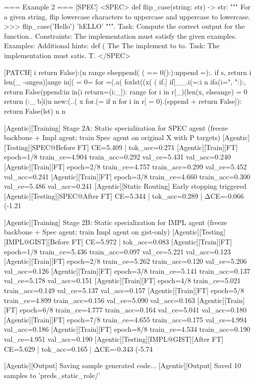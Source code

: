 === Example 2 ===
[SPEC]
<SPEC> def flip_case(string: str) -> str: """ For a given string, flip lowercase characters to uppercase and uppercase to lowercase. >>> flip_case('Hello') 'hELLO' """. Task: Compute the correct output for the function.. Constraints: The implementation must satisfy the given examples. Examples: Additional hints: def ( The The implement to to. Task: The implementation must satis. T. </SPEC>

[PATCH]
i return False):(n range elseppend( ( == 0():):nppend =):. if s, return i len(_ -angea)]ange in[( = 0= for =(.a( forlst((x( ( if.] if]__.i(=:i n ifa(i=", ":):, return False(ppend:in in(i return=(i:_]): range for i in r[_)(len(x, elseange) = 0 return (:_ b[i)n new:(..( x for.(= if n for i in r[  = 0).(sppend + return False]): return False(lst) n n

[Agentic][Training] Stage 2A: Static specialization for SPEC agent (freeze backbone + Impl agent; train Spec agent on original X with P targets)
[Agentic][Testing][SPEC@Before FT] CE=5.409 | tok_acc=0.271
[Agentic][Train][FT] epoch=1/8 train_ce=4.904 train_acc=0.292 val_ce=5.431 val_acc=0.240
[Agentic][Train][FT] epoch=2/8 train_ce=4.757 train_acc=0.299 val_ce=5.452 val_acc=0.241
[Agentic][Train][FT] epoch=3/8 train_ce=4.660 train_acc=0.300 val_ce=5.486 val_acc=0.241
[Agentic][Static Routing] Early stopping triggered
[Agentic][Testing][SPEC@After FT] CE=5.344 | tok_acc=0.289 | ΔCE=-0.066 (-1.21%

[Agentic][Training] Stage 2B: Static specialization for IMPL agent (freeze backbone + Spec agent; train Impl agent on gist-only)
[Agentic][Testing][IMPL@GIST][Before FT] CE=5.972 | tok_acc=0.083
[Agentic][Train][FT] epoch=1/8 train_ce=5.436 train_acc=0.097 val_ce=5.221 val_acc=0.123
[Agentic][Train][FT] epoch=2/8 train_ce=5.262 train_acc=0.120 val_ce=5.206 val_acc=0.126
[Agentic][Train][FT] epoch=3/8 train_ce=5.141 train_acc=0.137 val_ce=5.178 val_acc=0.151
[Agentic][Train][FT] epoch=4/8 train_ce=5.021 train_acc=0.149 val_ce=5.137 val_acc=0.157
[Agentic][Train][FT] epoch=5/8 train_ce=4.899 train_acc=0.156 val_ce=5.090 val_acc=0.163
[Agentic][Train][FT] epoch=6/8 train_ce=4.777 train_acc=0.164 val_ce=5.041 val_acc=0.180
[Agentic][Train][FT] epoch=7/8 train_ce=4.655 train_acc=0.175 val_ce=4.994 val_acc=0.186
[Agentic][Train][FT] epoch=8/8 train_ce=4.534 train_acc=0.190 val_ce=4.951 val_acc=0.190
[Agentic][Testing][IMPL@GIST][After FT] CE=5.629 | tok_acc=0.165 | ΔCE=-0.343 (-5.74%

[Agentic][Output] Saving sample generated code...
[Agentic][Output] Saved 10 samples to 'preds_static_role/'

